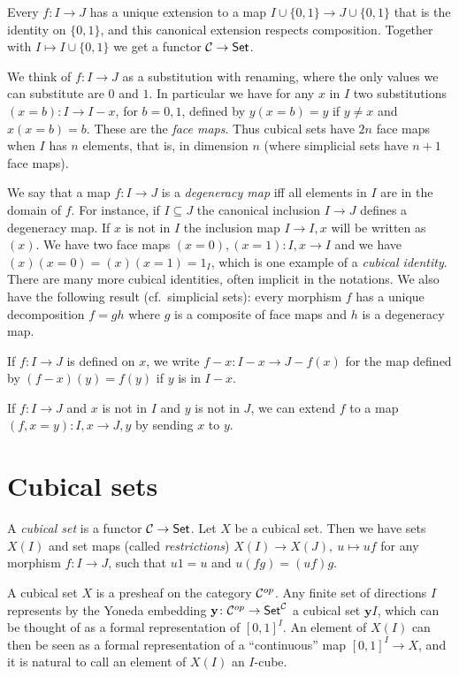 \documentclass[10pt,a4paper]{article}
\newcommand{\CC}{{\mathcal C}}
\newcommand{\set}[1]{\{#1\}}
\newcommand{\yoneda}{\mathbf{y}}
\begin{document}
Every $f:I\to J$ has a unique extension to a map $I \cup \set{0,1} \to J\cup \set{0,1}$
that is the identity on $\set{0,1}$, and this canonical extension respects composition.
Together with $I\mapsto I \cup \set{0,1}$ we get a functor $\CC\to{\sf Set}$.

 We think of $f:I\to J$ as a substitution with renaming,
 where the only values we can substitute are $0$ and $1$.
In particular we have for any $x$ in $I$ two substitutions $(x=b):I\to I-x$, for $b=0,1$,
defined by $y(x=b) = y$ if $y\neq x$ and $x(x=b) = b$. These are the \emph{face maps}.
Thus cubical sets have $2n$ face maps when $I$ has $n$ elements, that is, in dimension $n$
(where simplicial sets have $n+1$ face maps).

 We say that a map $f:I\to J$ is a {\em degeneracy map} if{f} all elements in $I$ are in
the domain of $f$. For instance, if $I\subseteq J$ the canonical inclusion $I \to J$ defines
a degeneracy map. If $x$ is not in $I$ the inclusion map $I \to I,x$ will be written as $(x)$.
We have two face maps $(x=0), (x=1):I,x\to I$ and we
have $(x)(x=0) = (x)(x=1) = 1_I$, which is one example of a \emph{cubical identity}.
There are many more cubical identities, often implicit in the notations. We also have
the following result (cf.\ simplicial sets): every morphism $f$ has a unique decomposition
$f=gh$ where $g$ is a composite of face maps and $h$ is a degeneracy map.

 If $f:I\to J$ is defined on $x$, we write $f-x:I-x \to J-{f(x)}$ for the map defined by
$(f-x)(y) = f(y)$ if $y$ is in $I-x.$

If $f:I\to J$ and $x$ is not in $I$ and $y$ is not in $J$, we can
extend $f$ to a map $(f,x=y):I,x\to J,y$ by sending $x$ to $y$.

\section{Cubical sets}

A \emph{cubical set} is a functor $\CC\to{\sf Set}$.  Let $X$ be a
cubical set. Then we have sets $X(I)$ and set maps (called
\emph{restrictions}) $X(I)\to X(J),~u\longmapsto uf$ for any morphism
$f:I\to J$, such that $u1 = u$ and $u(fg) = (uf)g$.

\medskip

A cubical set $X$ is a presheaf on the category ${\cal C}^{op}$. Any
finite set of directions $I$ represents by the Yoneda embedding
$\yoneda \colon {\cal C}^{op} \to {\sf Set}^{\cal C}$ a cubical set
$\yoneda I$, which can be thought of as a formal representation of
$[0,1]^I$.  An element of $X(I)$ can then be seen as a formal
representation of a ``continuous'' map $[0,1]^I\to X$, and it is
natural to call an element of $X(I)$ an $I$-cube.
\end{document}
